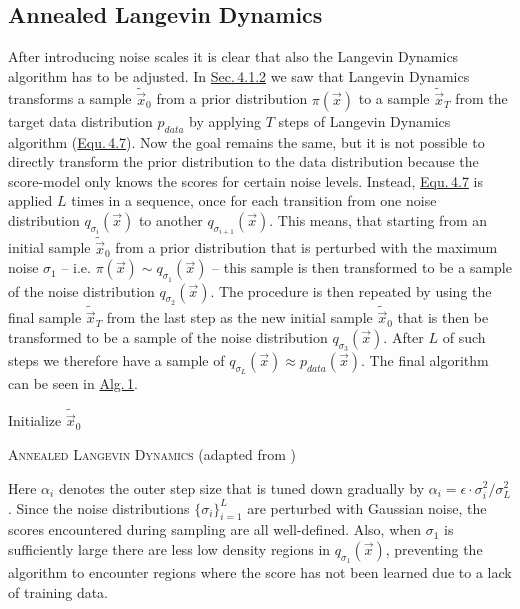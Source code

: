 \subsection{Annealed Langevin Dynamics} \label{4.3.2}
After introducing noise scales it is clear that also the Langevin Dynamics algorithm has to be adjusted. In \hyperref[sec:4.1.2]{Sec.\,4.1.2} we saw that Langevin Dynamics transforms a sample $\tilde{\vec{x}}_0$ from a prior distribution $\pi(\vec{x})$ to a sample $\tilde{\vec{x}}_T$ from the target data distribution $p_{data}$ by applying $T$ steps of Langevin Dynamics algorithm (\hyperref[equ:4.7]{Equ.\,4.7}). Now the goal remains the same, but it is not possible to directly transform the prior distribution to the data distribution because the score-model only knows the scores for certain noise levels. Instead, \hyperref[equ:4.7]{Equ.\,4.7} is applied $L$ times in a sequence, once for each transition from one noise distribution $q_{\sigma_i}(\vec{x})$ to another $q_{\sigma_{i+1}}(\vec{x})$. This means, that starting from an initial sample $\tilde{\vec{x}}_0$ from a prior distribution that is perturbed with the maximum noise $\sigma_1$ – i.e. $\pi(\vec{x})\sim q_{\sigma_1}(\vec{x})$ – this sample is then transformed to be a sample of the noise distribution $q_{\sigma_{2}}(\vec{x})$. The procedure is then repeated by using the final sample $\tilde{\vec{x}}_T$ from the last step as the new initial sample $\tilde{\vec{x}}_0$ that is then be transformed to be a sample of the noise distribution $q_{\sigma_{3}}(\vec{x})$. After $L$ of such steps we therefore have a sample of $q_{\sigma_L}(\vec{x})\approx p_{data}(\vec{x})$. The final algorithm can be seen in \hyperref[alg:1]{Alg.\,1}.
%
\begin{algorithm} \label{alg:1}
    \DontPrintSemicolon
    Initialize $\tilde{\vec{x}}_0$\;
    \caption[Annealed Langevin Dynamics]{\textsc{Annealed Langevin Dynamics} (adapted from \cite{score_1})}
\end{algorithm}

Here $\alpha_i$ denotes the outer step size that is tuned down gradually by $\alpha_i=\epsilon\cdot\sigma_i^2/\sigma_L^2$. Since the noise distributions $\{\sigma_i\}_{i=1}^L$ are perturbed with Gaussian noise, the scores encountered during sampling are all well-defined. Also, when $\sigma_1$ is sufficiently large there are less low density regions in $q_{\sigma_1}(\vec{x})$, preventing the algorithm to encounter regions where the score has not been learned due to a lack of training data.


